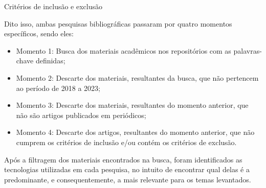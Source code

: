 \begin{table}[H]
\caption{Critérios de inclusão e exclusão}
\label{tab:prompts}
\caption*{Fonte: Autora (2023).}
\end{table}

Dito isso, ambas pesquisas bibliográficas passaram por quatro momentos específicos, sendo eles:
\begin{itemize}
    \item Momento 1: Busca dos materiais acadêmicos nos repositórios com as palavras-chave definidas;
    \item Momento 2: Descarte dos materiais, resultantes da busca, que não pertencem ao período de 2018 a 2023;
    \item Momento 3: Descarte dos materiais, resultantes do momento anterior, que não são artigos publicados em periódicos;
    \item Momento 4: Descarte dos artigos, resultantes do momento anterior, que não cumprem os critérios de inclusão e/ou contém os critérios de exclusão.
\end{itemize}

Após a filtragem dos materiais encontrados na busca, foram identificados as tecnologias utilizadas em cada pesquisa, no intuito de encontrar qual delas é a predominante, e consequentemente, a mais relevante para os temas levantados.

